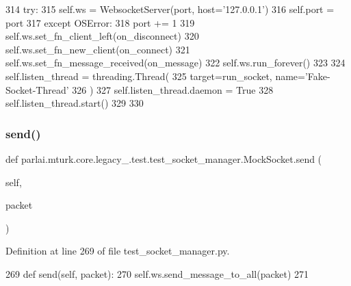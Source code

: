 \begin{DoxyCode}
314                 \textcolor{keywordflow}{try}:
315                     self.ws = WebsocketServer(port, host=\textcolor{stringliteral}{'127.0.0.1'})
316                     self.port = port
317                 \textcolor{keywordflow}{except} OSError:
318                     port += 1
319             self.ws.set\_fn\_client\_left(on\_disconnect)
320             self.ws.set\_fn\_new\_client(on\_connect)
321             self.ws.set\_fn\_message\_received(on\_message)
322             self.ws.run\_forever()
323 
324         self.listen\_thread = threading.Thread(
325             target=run\_socket, name=\textcolor{stringliteral}{'Fake-Socket-Thread'}
326         )
327         self.listen\_thread.daemon = \textcolor{keyword}{True}
328         self.listen\_thread.start()
329 
330 
\end{DoxyCode}
\mbox{\label{classparlai_1_1mturk_1_1core_1_1legacy__2018_1_1test_1_1test__socket__manager_1_1MockSocket_a975ba8e22a8030a58a8a199a580693c8}} 
\subsubsection{\texorpdfstring{send()}{send()}}
{\footnotesize\ttfamily def parlai.\+mturk.\+core.\+legacy\+\_.\+test.\+test\+\_\+socket\+\_\+manager.\+Mock\+Socket.\+send (\begin{DoxyParamCaption}\item[{}]{self,  }\item[{}]{packet }\end{DoxyParamCaption})}



Definition at line 269 of file test\+\_\+socket\+\_\+manager.\+py.


\begin{DoxyCode}
269     \textcolor{keyword}{def }send(self, packet):
270         self.ws.send\_message\_to\_all(packet)
271 
\end{DoxyCode}


